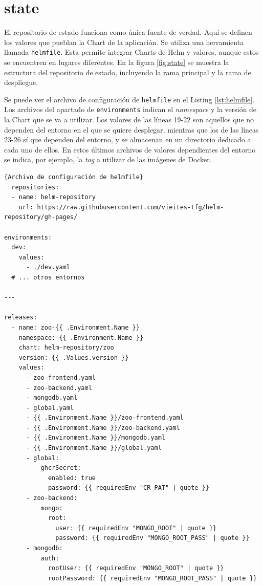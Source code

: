 \section{state}
\label{subsec:state}


El repositorio de estado funciona como única fuente de verdad. Aquí se definen  los valores que pueblan la Chart de la aplicación. Se utiliza una herramienta llamada \texttt{helmfile}\cite{helmfile}. Esta permite integrar Charts de Helm y valores, aunque estos se encuentren en lugares diferentes. En la figura \ref{fig:state} se muestra la estructura del repositorio de estado, incluyendo la rama principal y la rama de despliegue.

Se puede ver el archivo de configuración de \texttt{helmfile} en el Listing \ref{lst:helmfile}. Los archivos del apartado de \texttt{environments} indican el \textit{namespace} y la versión de la Chart que se va a utilizar. Los valores de las líneas 19-22 son aquellos que no dependen del entorno en el que se quiere desplegar, mientras que los de las líneas 23-26 sí que dependen del entorno, y se almacenan en un directorio dedicado a cada uno de ellos. En estos últimos archivos de valores dependientes del entorno se indica, por ejemplo, la \textit{tag} a utilizar de las imágenes de Docker.

\begin{lstlisting}[language=helmfile,label=lst:helmfile]{Archivo de configuración de helmfile}
  repositories:
  - name: helm-repository
    url: https://raw.githubusercontent.com/vieites-tfg/helm-repository/gh-pages/

environments:
  dev:
    values:
      - ./dev.yaml
  # ... otros entornos

---

releases:
  - name: zoo-{{ .Environment.Name }}
    namespace: {{ .Environment.Name }}
    chart: helm-repository/zoo
    version: {{ .Values.version }}
    values:
      - zoo-frontend.yaml
      - zoo-backend.yaml
      - mongodb.yaml
      - global.yaml
      - {{ .Environment.Name }}/zoo-frontend.yaml
      - {{ .Environment.Name }}/zoo-backend.yaml
      - {{ .Environment.Name }}/mongodb.yaml
      - {{ .Environment.Name }}/global.yaml
      - global:
          ghcrSecret:
            enabled: true
            password: {{ requiredEnv "CR_PAT" | quote }}
      - zoo-backend:
          mongo:
            root:
              user: {{ requiredEnv "MONGO_ROOT" | quote }}
              password: {{ requiredEnv "MONGO_ROOT_PASS" | quote }}
      - mongodb:
          auth:
            rootUser: {{ requiredEnv "MONGO_ROOT" | quote }}
            rootPassword: {{ requiredEnv "MONGO_ROOT_PASS" | quote }}
\end{lstlisting}

